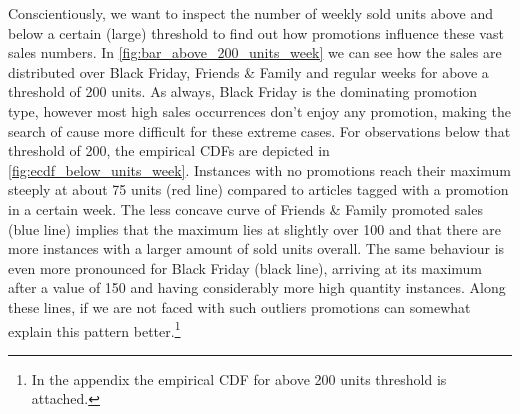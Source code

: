 Conscientiously, we want to inspect the number of weekly sold units above and below a certain (large) threshold to find out how promotions influence these vast sales numbers. In \autoref{fig:bar_above_200_units_week} we can see how the sales are distributed over Black Friday, Friends \& Family and regular weeks for above a threshold of 200 units. As always, Black Friday is the dominating promotion type, however most high sales occurrences don't enjoy any promotion, making the search of cause more difficult for these extreme cases. For observations below that threshold of 200, the empirical \acp{CDF} are depicted in \autoref{fig:ecdf_below_units_week}. Instances with no promotions reach their maximum steeply at about 75 units (red line) compared to articles tagged with a promotion in a certain week. The less concave curve of Friends \& Family promoted sales (blue line) implies that the maximum lies at slightly over 100 and that there are more instances with a larger amount of sold units overall. The same behaviour is even more pronounced for Black Friday (black line), arriving at its maximum after a value of 150 and having considerably more high quantity instances. Along these lines, if we are not faced with such outliers promotions can somewhat explain this pattern better.\footnote{In the appendix the empirical CDF for above 200 units threshold is attached.}\\

